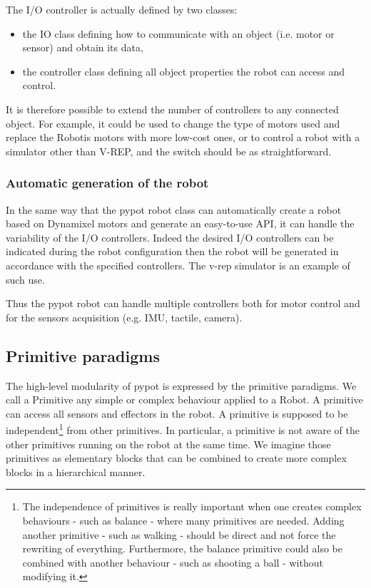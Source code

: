 The I/O controller is actually defined by two classes:

\begin{itemize}
    \item the IO class defining how to communicate with an object (i.e. motor or sensor) and obtain its data,
    \item the controller class defining all object properties the robot can access and control.
\end{itemize}

It is therefore possible to extend the number of controllers to any connected object. For example, it could be used to change the type of motors used and replace the Robotis motors with more low-cost ones, or to control a robot with a simulator other than V-REP, and the switch should be as straightforward.




\subsubsection{Automatic generation of the robot} %
In the same way that the pypot robot class can automatically create a robot based on Dynamixel motors and generate an easy-to-use API, it can handle the variability of the I/O controllers. Indeed the desired I/O controllers can be indicated during the robot configuration then the robot will be generated in accordance with the specified controllers. The v-rep simulator is an example of such use.

Thus the pypot robot can handle multiple controllers both for motor control and for the sensors acquisition (e.g. IMU, tactile, camera).


\subsection{Primitive paradigms} %
\label{sub:primitive-paradigms}

The high-level modularity of pypot is expressed by the primitive paradigms. We call a Primitive any simple or complex behaviour applied to a Robot. A primitive can access all sensors and effectors in the robot. A primitive is supposed to be independent\footnote{The independence of primitives is really important when one creates complex behaviours - such as balance - where many primitives are needed. Adding another primitive - such as walking - should be direct and not force the rewriting of everything. Furthermore, the balance primitive could also be combined with another behaviour - such as shooting a ball - without modifying it.} from other primitives. In particular, a primitive is not aware of the other primitives running on the robot at the same time. We imagine those primitives as elementary blocks that can be combined to create more complex blocks in a hierarchical manner.

